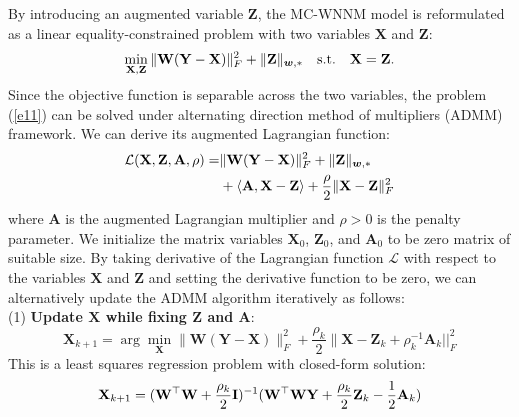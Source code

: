 \documentclass[10pt,twocolumn,letterpaper,sort&compress]{article}
\begin{document}
By introducing an augmented variable $\mathbf{Z}$, the MC-WNNM model is reformulated as a linear equality-constrained problem with two variables $\mathbf{X}$ and $\mathbf{Z}$:
\vspace{-1mm}
\begin{equation}
\label{e11}
\vspace{-1mm}
\min_{\mathbf{X},\mathbf{Z}}\|\mathbf{W}(\mathbf{Y}-\mathbf{X})\|_{F}^{2}
+
\|\mathbf{Z}\|_{\bm{w},*}
\quad
\text{s.t.}
\quad
\mathbf{X}=\mathbf{Z}.
\end{equation}
Since the objective function is separable across the two variables, the problem (\ref{e11}) can be solved under alternating direction method of multipliers (ADMM) framework. We can derive its augmented Lagrangian function:
\vspace{-1mm}
\begin{equation}
\label{e12}
\vspace{-1mm}
\begin{split}
\mathcal{L}(\mathbf{X},\mathbf{Z},\mathbf{A},\rho)
=
&\|\mathbf{W}(\mathbf{Y}-\mathbf{X})\|_{F}^{2}
+
\|\mathbf{Z}\|_{\bm{w},*}
\\
&
+
\langle
\mathbf{A},\mathbf{X}-\mathbf{Z}
\rangle
+
\frac{\rho}{2}
\|\mathbf{X}-\mathbf{Z}\|_{F}^{2}
\end{split}
\end{equation}
where $\mathbf{A}$ is the augmented Lagrangian multiplier and $\rho>0$ is the penalty parameter. We initialize the matrix variables $\mathbf{X}_{0}$, $\mathbf{Z}_{0}$, and $\mathbf{A}_{0}$ to be zero matrix of suitable size. By taking derivative of the Lagrangian function $\mathcal{L}$ with respect to the variables $\mathbf{X}$ and $\mathbf{Z}$ and setting the derivative function to be zero, we can alternatively update the ADMM algorithm iteratively as follows:
\\
(1) \textbf{Update $\mathbf{X}$ while fixing $\mathbf{Z}$ and $\mathbf{A}$}:
\vspace{-1mm}
\begin{equation}
\label{e13}
\mathbf{X}_{k+1}
=
\arg\min_{\mathbf{X}}
\|\mathbf{W}(\mathbf{Y}-\mathbf{X})\|_{F}^{2} 
+
\frac{\rho_{k}}{2}\|\mathbf{X} - \mathbf{Z}_{k} + \rho_{k}^{-1}\mathbf{A}_{k}||_{F}^{2}
\end{equation}
This is a least squares regression problem with closed-form solution:
\vspace{-1mm}
\begin{equation}
\label{e14}
\vspace{-1mm}
\mathbf{X}_{k+1}
=
(\mathbf{W}^{\top}\mathbf{W}+\frac{\rho_{k}}{2}\mathbf{I})^{-1}
(\mathbf{W}^{\top}\mathbf{W}\mathbf{Y} + \frac{\rho_{k}}{2}\mathbf{Z}_{k} -\frac{1}{2}\mathbf{A}_{k})
\end{equation}
\end{document}
